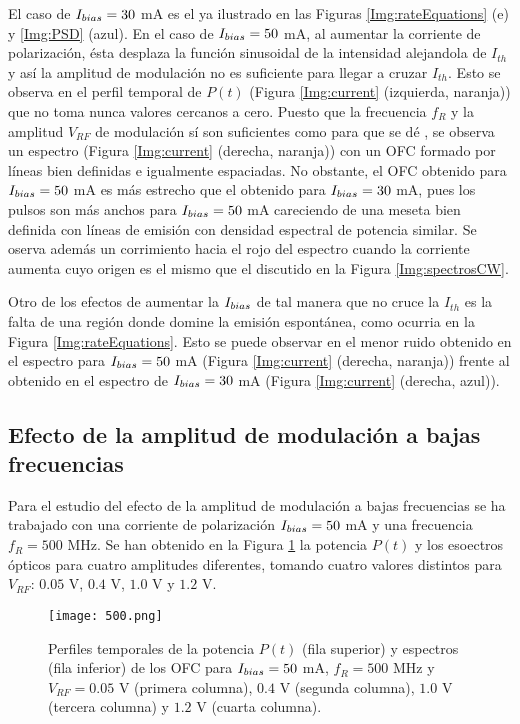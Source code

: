		El caso de $I_{bias} = 30$ mA es el ya ilustrado en las Figuras \ref{Img:rateEquations} (e) y \ref{Img:PSD} (azul). En el caso de $I_{bias} = 50$ mA, al aumentar la corriente de polarizaci\'on, \'esta desplaza la función sinusoidal de la intensidad alejandola de $I_{th}$ y as\'i la amplitud de modulaci\'on no es suficiente para llegar a cruzar $I_{th}$. Esto se observa en el perfil temporal de $P(t)$ (Figura \ref{Img:current} (izquierda, naranja)) que no toma nunca valores cercanos a cero. Puesto que la frecuencia $f_R$ y la amplitud $V_{RF}$ de modulación s\'i son suficientes como para que se d\'e \gs, se observa un espectro (Figura \ref{Img:current} (derecha, naranja)) con un OFC formado por l\'ineas bien definidas e igualmente espaciadas. No obstante, el OFC obtenido para $I_{bias} = 50$ mA es m\'as estrecho que el obtenido para $I_{bias} = 30$ mA, pues los pulsos son más anchos para $I_{bias} = 50$ mA careciendo de una meseta bien definida con l\'ineas de emisi\'on con densidad espectral de potencia similar. Se oserva además un corrimiento hacia el rojo del espectro cuando la corriente aumenta cuyo origen es el mismo que el discutido en la Figura \ref{Img:spectrosCW}.

		Otro de los efectos de aumentar la $I_{bias}$ de tal manera que no cruce la $I_{th}$ es la falta de una regi\'on donde domine la emisi\'on espont\'anea, como ocurria en la Figura \ref{Img:rateEquations}. Esto se puede observar en el menor ruido obtenido en el espectro para $I_{bias} = 50$ mA (Figura \ref{Img:current} (derecha, naranja)) frente al obtenido en el espectro de $I_{bias} = 30$ mA (Figura \ref{Img:current} (derecha, azul)).

	\subsection{Efecto de la amplitud de modulación a bajas frecuencias}
		\label{Sol:OFC:LwFreq}

		Para el estudio del efecto de la amplitud de modulación a bajas frecuencias se ha trabajado con una corriente de polarización $I_{bias} = 50$ mA y una frecuencia $f_R = 500$ MHz. Se han obtenido en la Figura \ref{Img:500} la potencia $P(t)$ y los esoectros ópticos para cuatro amplitudes diferentes, tomando cuatro valores distintos para $V_{RF}$: $0.05$ V, $0.4$ V, $1.0$ V y $1.2$ V.

			\begin{figure}[H]
				\centering
				\texttt{[image: 500.png]}
				\caption{\label{Img:500}Perfiles temporales de la potencia $P(t)$ (fila superior) y espectros (fila inferior) de los OFC para $I_{bias} = 50$ mA, $f_R = 500$ MHz y $V_{RF} = 0.05$ V (primera columna), $0.4$ V (segunda columna), $1.0$ V (tercera columna) y $1.2$ V (cuarta columna).}	
			\end{figure}

